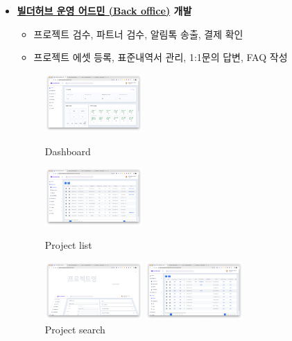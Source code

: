 \begin{itemize}[label=]
\begin{itemize}[label=]
\begin{figure}[!ht]
\begin{fullwidth}
{				            }
			            \end{fullwidth}
		            \end{figure}
		      \item \textbf{\href{https://admin.prod.platform.builderhub.io/}{빌더허브 운영 어드민 (Back office)} 개발}
		            \begin{itemize}
			            \item 프로젝트 검수, 파트너 검수, 알림톡 송출, 결제 확인
			            \item 프로젝트 에셋 등록, 표준내역서 관리, 1:1문의 답변, FAQ 작성
		            \end{itemize}
		            \begin{figure}[!ht]
			            \begin{fullwidth}
				            \parbox{0.35\textwidth}{
					            \centering
					            \includegraphics[width=0.35\textwidth]{images/builderhub-admin-dashboard.png}
					            \caption*{Dashboard}
				            }\qquad
				            \parbox{0.35\textwidth}{
					            \centering
					            \includegraphics[width=0.35\textwidth]{images/builderhub-admin-project-list.png}
					            \caption*{Project list}
				            }\qquad
				            \parbox{0.35\textwidth}{
					            \centering
					            \includegraphics[width=0.35\textwidth]{images/builderhub-admin-project-search.png}
					            \caption*{Project search}
				            }\qquad
				            \parbox{0.35\textwidth}{
					            \centering
					            \includegraphics[width=0.35\textwidth]{images/builderhub-admin-member-list.png}
}
\end{fullwidth}
\end{figure}
\end{itemize}
\end{itemize}
